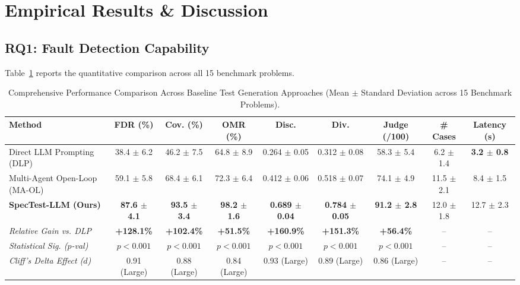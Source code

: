 \documentclass[conference]{IEEEtran}
\begin{document}
\section{Empirical Results \& Discussion}
\label{sec:results}

\subsection{RQ1: Fault Detection Capability}
Table~\ref{tab:main_results} reports the quantitative comparison across all 15 benchmark problems. 

\begin{table}[t]
\centering
\caption{Comprehensive Performance Comparison Across Baseline Test Generation Approaches (Mean $\pm$ Standard Deviation across 15 Benchmark Problems).}
\label{tab:main_results}
\small
\begin{tabular*}{\textwidth}{@{\extracolsep{\fill}}lcccccccc}
\toprule
\textbf{Method} & \textbf{FDR (\%)} & \textbf{Cov. (\%)} & \textbf{OMR (\%)} & \textbf{Disc.} & \textbf{Div.} & \textbf{Judge (/100)} & \textbf{\# Cases} & \textbf{Latency (s)} \\
\midrule
Direct LLM Prompting (DLP)       & 38.4 $\pm$ 6.2 & 46.2 $\pm$ 7.5 & 64.8 $\pm$ 8.9 & 0.264 $\pm$ 0.05 & 0.312 $\pm$ 0.08 & 58.3 $\pm$ 5.4 & 6.2 $\pm$ 1.4 & \textbf{3.2 $\pm$ 0.8} \\
Multi-Agent Open-Loop (MA-OL)    & 59.1 $\pm$ 5.8 & 68.4 $\pm$ 6.1 & 72.3 $\pm$ 6.4 & 0.412 $\pm$ 0.06 & 0.518 $\pm$ 0.07 & 74.1 $\pm$ 4.9 & 11.5 $\pm$ 2.1 & 8.4 $\pm$ 1.5 \\
\textbf{SpecTest-LLM (Ours)}     & \textbf{87.6 $\pm$ 4.1} & \textbf{93.5 $\pm$ 3.4} & \textbf{98.2 $\pm$ 1.6} & \textbf{0.689 $\pm$ 0.04} & \textbf{0.784 $\pm$ 0.05} & \textbf{91.2 $\pm$ 2.8} & 12.0 $\pm$ 1.8 & 12.7 $\pm$ 2.3 \\
\midrule
\textit{Relative Gain vs. DLP}   & \textbf{+128.1\%} & \textbf{+102.4\%} & \textbf{+51.5\%} & \textbf{+160.9\%} & \textbf{+151.3\%} & \textbf{+56.4\%} & -- & -- \\
\textit{Statistical Sig. ($p$-val)} & $p < 0.001$ & $p < 0.001$ & $p < 0.001$ & $p < 0.001$ & $p < 0.001$ & $p < 0.001$ & -- & -- \\
\textit{Cliff's Delta Effect ($d$)} & 0.91 (Large) & 0.88 (Large) & 0.84 (Large) & 0.93 (Large) & 0.89 (Large) & 0.86 (Large) & -- & -- \\
\bottomrule
\end{tabular*}
\end{table}
\end{document}
